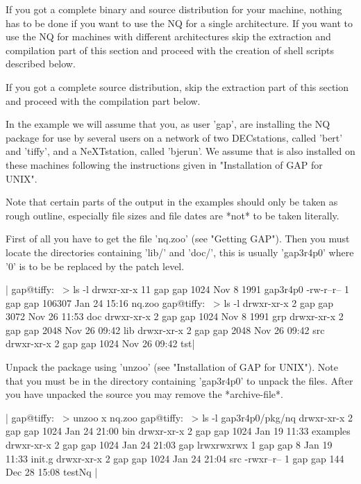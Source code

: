 If you got  a complete binary and  source distribution for your  machine,
nothing  has   to be done  if   you want to  use    the NQ for   a single
architecture.  If  you  want to use  the NQ  for  machines with different
architectures skip  the extraction and  compilation part of  this section
and proceed with the creation of shell scripts described below.

If you  got a complete source distribution,  skip the  extraction part of
this section and proceed with the compilation part below.

In the example we will assume that you, as user 'gap', are installing the
NQ  package for  use by  several users on  a network of two  DECstations,
called 'bert' and 'tiffy', and a NeXTstation, called 'bjerun'. We  assume
that  {\GAP}  is  also   installed  on  these   machines  following   the
instructions given in "Installation of GAP for UNIX".

Note that certain parts  of  the  output  in the examples should  only be
taken as rough outline, especially file sizes and file dates are *not* to
be taken literally.

First of all you have to get the file 'nq.zoo' (see "Getting GAP").  Then
you must locate the {\GAP} directories containing 'lib/' and 'doc/', this
is usually 'gap3r4p0' where '0' is to be be replaced by the patch level.

|    gap@tiffy:~ > ls -l
    drwxr-xr-x  11 gap      gap          1024 Nov  8  1991 gap3r4p0
    -rw-r--r--   1 gap      gap        106307 Jan 24 15:16 nq.zoo
    gap@tiffy:~ > ls -l
    drwxr-xr-x   2 gap      gap          3072 Nov 26 11:53 doc
    drwxr-xr-x   2 gap      gap          1024 Nov  8  1991 grp
    drwxr-xr-x   2 gap      gap          2048 Nov 26 09:42 lib
    drwxr-xr-x   2 gap      gap          2048 Nov 26 09:42 src
    drwxr-xr-x   2 gap      gap          1024 Nov 26 09:42 tst|

Unpack the package using 'unzoo'  (see  "Installation of GAP for  UNIX").
Note  that you must  be in the  directory containing 'gap3r4p0' to unpack
the files.  After   you have  unpacked the source   you   may remove  the
*archive-file*.

|    gap@tiffy:~ > unzoo x nq.zoo
    gap@tiffy:~ > ls -l gap3r4p0/pkg/nq
    drwxr-xr-x   2 gap    gap      1024 Jan 24 21:00 bin
    drwxr-xr-x   2 gap    gap      1024 Jan 19 11:33 examples
    drwxr-xr-x   2 gap    gap      1024 Jan 24 21:03 gap
    lrwxrwxrwx   1 gap    gap         8 Jan 19 11:33 init.g
    drwxr-xr-x   2 gap    gap      1024 Jan 24 21:04 src
    -rwxr--r--   1 gap    gap       144 Dec 28 15:08 testNq |

